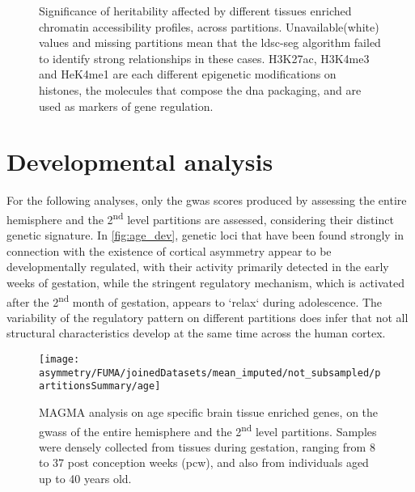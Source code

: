 \begin{figure}[H]
	\begin{adjustwidth}{-3cm}{-2.5cm}
	\centering
	
	\end{adjustwidth}
	\caption[LDSC-SEG assessment on variable chromatin accessibility]{Significance of heritability affected by different tissues enriched chromatin accessibility profiles, across partitions. Unavailable(white) values and missing partitions mean that the \ac{ldsc-seg} algorithm failed to identify strong relationships in these cases. H3K27ac, H3K4me3 and HeK4me1 are each different epigenetic modifications on histones, the molecules that compose the \ac{dna} packaging, and are used as markers of gene regulation.}
	\label{fig:ldsc-seg-chromatin}
\end{figure}

\section{Developmental analysis}
For the following analyses, only the \ac{gwas} scores produced by assessing the entire hemisphere and the 2\textsuperscript{nd} level partitions are assessed, considering their distinct genetic signature. In \autoref{fig:age_dev}, genetic loci that have been found strongly in connection with the existence of cortical asymmetry appear to be developmentally regulated, with their activity primarily detected in the early weeks of gestation, while the stringent regulatory mechanism, which is activated after the 2\textsuperscript{nd} month of gestation, appears to `relax` during adolescence. The variability of the regulatory pattern on different partitions does infer that not all structural characteristics develop at the same time across the human cortex.

\begin{figure}[H]
	\begin{adjustwidth}{-3.5cm}{-3cm}
	\centering
	\texttt{[image: asymmetry/FUMA/joinedDatasets/mean\_imputed/not\_subsampled/partitionsSummary/age]}
	\end{adjustwidth}
	\caption[Brain tissue specific age enriched genes analysis]{MAGMA analysis on age specific brain tissue enriched genes, on the \acp{gwas} of the entire hemisphere and the 2\textsuperscript{nd} level partitions. Samples were densely collected from tissues during gestation, ranging from 8 to 37 post conception weeks (pcw), and also from individuals aged up to 40 years old.}
	\label{fig:age_dev}
\end{figure}

